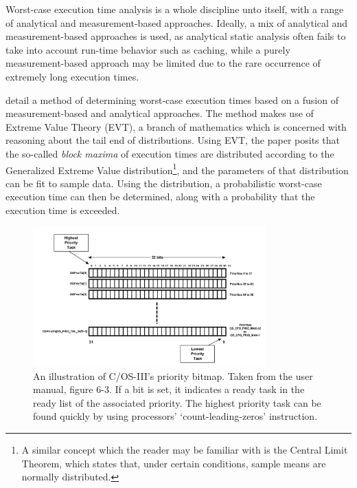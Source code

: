 \documentclass[twoside]{uva-inf-bachelor-thesis}
\newcommand{\ucosiii}{\textmu C/OS-III\xspace}
\begin{document}
Worst-case execution time analysis is a whole discipline unto itself, with a range of analytical and measurement-based approaches. Ideally, a mix of analytical and measurement-based approaches is used, as analytical static analysis often fails to take into account run-time behavior such as caching, while a purely measurement-based approach may be limited due to the rare occurrence of extremely long execution times.

\textcite{hansen_et_al:wcet} detail a method of determining worst-case execution times based on a fusion of measurement-based and analytical approaches. The method makes use of Extreme Value Theory (EVT), a branch of mathematics which is concerned with reasoning about the tail end of distributions. Using EVT, the paper posits that the so-called \emph{block maxima} of execution times are distributed according to the Generalized Extreme Value distribution\footnote{A similar concept which the reader may be familiar with is the Central Limit Theorem, which states that, under certain conditions, sample means are normally distributed.}, and the parameters of that distribution can be fit to sample data. Using the distribution, a probabilistic worst-case execution time can then be determined, along with a probability that the execution time is exceeded.

\begin{figure}[htpb]
    \centering
    \includegraphics[width=0.8\textwidth]{priobitmap.png}
    \caption{An illustration of \ucosiii's priority bitmap. Taken from the user manual, figure 6-3. If a bit is set, it indicates a ready task in the ready list of the associated priority. The highest priority task can be found quickly by using processors' `count-leading-zeros' instruction.}
    \label{fig:priobitmap}
\end{figure}

\end{document}
